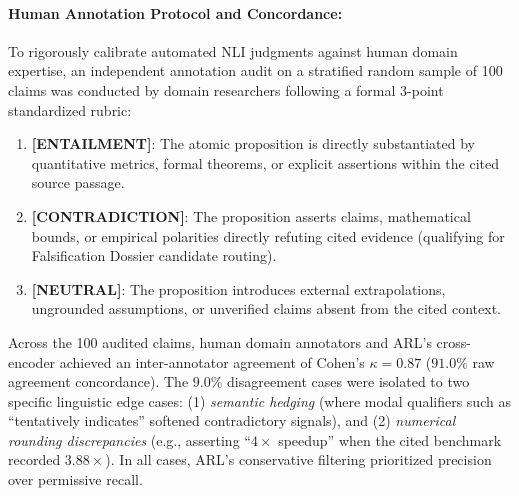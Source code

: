 \documentclass[10pt,twocolumn,letterpaper]{article}
\begin{document}
\paragraph{Human Annotation Protocol and Concordance:}
To rigorously calibrate automated NLI judgments against human domain expertise, an independent annotation audit on a stratified random sample of 100 claims was conducted by domain researchers following a formal 3-point standardized rubric:
\begin{enumerate}
    \item \textbf{[ENTAILMENT]}: The atomic proposition is directly substantiated by quantitative metrics, formal theorems, or explicit assertions within the cited source passage.
    \item \textbf{[CONTRADICTION]}: The proposition asserts claims, mathematical bounds, or empirical polarities directly refuting cited evidence (qualifying for Falsification Dossier candidate routing).
    \item \textbf{[NEUTRAL]}: The proposition introduces external extrapolations, ungrounded assumptions, or unverified claims absent from the cited context.
\end{enumerate}
Across the 100 audited claims, human domain annotators and ARL's cross-encoder achieved an inter-annotator agreement of Cohen's $\kappa = 0.87$ ($91.0\%$ raw agreement concordance). The $9.0\%$ disagreement cases were isolated to two specific linguistic edge cases: (1) \textit{semantic hedging} (where modal qualifiers such as ``tentatively indicates'' softened contradictory signals), and (2) \textit{numerical rounding discrepancies} (e.g., asserting ``$4\times$ speedup'' when the cited benchmark recorded $3.88\times$). In all cases, ARL's conservative filtering prioritized precision over permissive recall.

\begin{table}[t]
\centering
\small
{}
\caption{Quantitative ablation on ARL-Bench across multi-agent baselines, topological discovery, and cross-domain sandboxed code synthesis. Values report mean $\pm$ standard deviation across 5-fold stratified cross-validation ($^*p < 0.001$, two-tailed Student's $t$-test against baselines).}
\label{tab:arl_bench}
\end{table}
\end{document}

